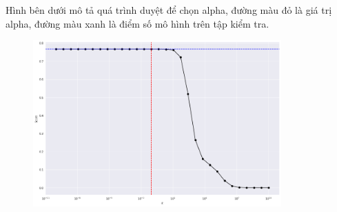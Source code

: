 \documentclass{article}
\begin{document}
\begin{itemize}
		Hình bên dưới mô tả quá trình duyệt để chọn alpha, đường màu đỏ là giá trị alpha, đường màu xanh là điểm số mô hình trên tập kiểm tra.
		\begin{figure}[H]
			\centering
			\includegraphics[width=0.85\textwidth]{images/ridge_reg/ridge_choose_alpha.png}
		\end{figure}
		

\end{itemize}
\end{document}
